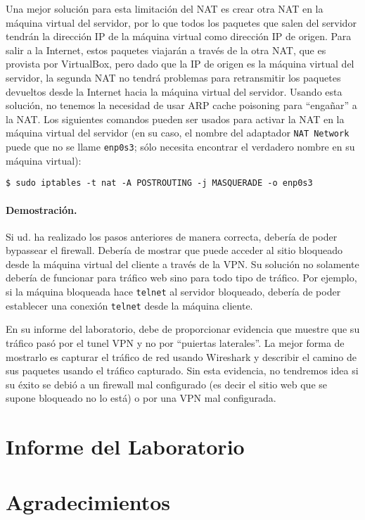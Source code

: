 Una mejor solución para esta limitación del NAT es crear otra NAT en la máquina virtual del servidor, por lo que todos los paquetes que salen del servidor tendrán la dirección IP de la máquina virtual como dirección IP de origen.
Para salir a la Internet, estos paquetes viajarán a través de la otra NAT, que es provista por VirtualBox, pero dado que la IP de origen es la máquina virtual del servidor, la segunda NAT no tendrá problemas para retransmitir los paquetes devueltos desde la Internet hacia la máquina virtual del servidor. Usando esta solución, no tenemos la necesidad de usar ARP cache poisoning para ``engañar'' a la NAT. Los siguientes comandos pueden ser usados para activar la NAT en la máquina virtual del servidor (en su caso, el nombre del adaptador \texttt{NAT Network} puede que no se llame \texttt{enp0s3}; sólo necesita encontrar el verdadero nombre en su máquina virtual):

    
\begin{lstlisting}
$ sudo iptables -t nat -A POSTROUTING -j MASQUERADE -o enp0s3
\end{lstlisting}
    

\paragraph{Demostración.}
Si ud. ha realizado los pasos anteriores de manera correcta, debería de poder bypassear el firewall. Debería de mostrar que puede acceder al sitio bloqueado desde la máquina virtual del cliente a través de la VPN. Su solución no solamente debería de funcionar para tráfico web sino para todo tipo de tráfico. Por ejemplo, si la máquina bloqueada hace \texttt{telnet} al servidor bloqueado, debería de poder establecer una conexión \texttt{telnet} desde la máquina cliente.

En su informe del laboratorio, debe de proporcionar evidencia que muestre que su tráfico pasó por el tunel VPN y no por ``puiertas laterales''. La mejor forma de mostrarlo es capturar el tráfico de red usando Wireshark y describir el camino de sus paquetes usando el tráfico capturado. Sin esta evidencia, no tendremos idea si su éxito se debió a un firewall mal configurado (es decir el sitio web que se supone bloqueado no lo está) o por una VPN mal configurada.

\section{Informe del Laboratorio}



\section*{Agradecimientos}






